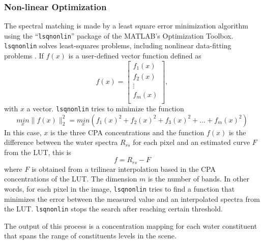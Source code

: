 \subsubsection{Non-linear Optimization}
The spectral matching is made by a least square error minimization algorithm using the ``\texttt{lsqnonlin}'' package of the MATLAB's Optimization Toolbox. \texttt{lsqnonlin} solves least-squares problems, including nonlinear data-fitting problems . If $f(x)$ is a user-defined vector function defined as
\begin{equation}
  f(x)=
  \left[
    \begin{array}{c}
      f_1(x) \\
      f_2(x) \\
      \vdots \\
      f_m(x) \\
    \end{array}
  \right],
\end{equation}
with $x$ a vector. \texttt{lsqnonlin} tries to minimize the function
\begin{equation}
  \underset{x}{min}\parallel f(x) \parallel^2_2=\underset{x}{min}(f_1(x)^2+f_2(x)^2+f_3(x)^2+...+f_m(x)^2)
\end{equation}
In this case, $x$ is the three CPA concentrations and the function $f(x)$ is the difference between the water spectra $R_{rs}$ for each pixel and an estimated curve $F$ from the LUT, this is
\begin{equation}
  f = R_{rs} - F
\end{equation}
where $F$ is obtained from a trilinear interpolation based in the CPA concentrations of the LUT. The dimension $m$ is the number of bands. In other words, for each pixel in the image, \texttt{lsqnonlin} tries to find a function that minimizes the error between the measured value and an interpolated spectra from the LUT. \texttt{lsqnonlin} stops the search after reaching certain threshold. 

The output of this process is a concentration mapping for each water constituent that spans the range of constituents levels in the scene. 

